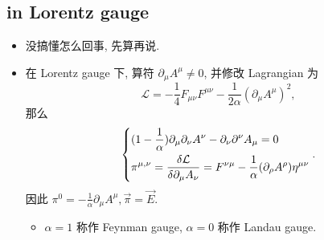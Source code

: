\subsection{in Lorentz gauge}
\begin{itemize}
	\item 没搞懂怎么回事, 先算再说.
	
	\item 在 Lorentz gauge 下, 算符 $\partial_\mu A^\mu \neq 0$, 并修改 Lagrangian 为
	\begin{equation}
		\mathcal{L} = - \frac{1}{4} F_{\mu \nu} F^{\mu \nu} - \frac{1}{2 \alpha} (\partial_\mu A^\mu)^2,
	\end{equation}
	那么
	\begin{equation}
		\begin{dcases}
			(1 - \frac{1}{\alpha}) \partial_\mu \partial_\nu A^\nu - \partial_\nu \partial^\nu A_\mu = 0 \\
			\pi^{\mu, \nu} = \frac{\delta \mathcal{L}}{\delta \partial_\mu A_\nu} = F^{\nu \mu} - \frac{1}{\alpha} (\partial_\rho A^\rho) \eta^{\mu \nu}
		\end{dcases}.
	\end{equation}
	因此 $\pi^0 = - \frac{1}{\alpha} \partial_\mu A^\mu, \vec{\pi} = \vec{E}$.
	\begin{itemize}
		\item $\alpha = 1$ 称作 Feynman gauge, $\alpha = 0$ 称作 Landau gauge.
	\end{itemize}
	

\end{itemize}
